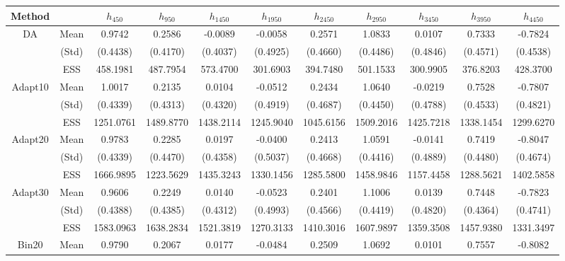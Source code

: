 { \renewcommand{\arraystretch}{1.2} 
\begin{table} 
\center 
\begin{tabular}{cc ccccccccc} 
 Method &  & $h_{450}$ & $h_{950}$ & $h_{1450}$ & $h_{1950}$ & $h_{2450}$ & $h_{2950}$ & $h_{3450}$ & $h_{3950}$ & $h_{4450}$ \\ \hline  \hline
\rowcolor{LightCyan} 
DA & Mean 
 & 0.9742  & 0.2586  & -0.0089  & -0.0058  & 0.2571  & 1.0833  & 0.0107  & 0.7333  & -0.7824  \\  [0.75ex] 
 & (Std) 
 & (0.4438)  & (0.4170)  & (0.4037)  & (0.4925)  & (0.4660)  & (0.4486)  & (0.4846)  & (0.4571)  & (0.4538)  \\  [0.75ex] 
 [111.83 s] & ESS 
 & 458.1981  & 487.7954  & 573.4700  & 301.6903  & 394.7480  & 501.1533  & 300.9905  & 376.8203  & 428.3700  \\  [0.75ex] 
\rowcolor{LightCyan} 
Adapt10 & Mean 
 & 1.0017  & 0.2135  & 0.0104  & -0.0512  & 0.2434  & 1.0640  & -0.0219  & 0.7528  & -0.7807  \\  [0.75ex] 
 & (Std) 
 & (0.4339)  & (0.4313)  & (0.4320)  & (0.4919)  & (0.4687)  & (0.4450)  & (0.4788)  & (0.4533)  & (0.4821)  \\  [0.75ex] 
 [1980.48 s] & ESS 
 & 1251.0761  & 1489.8770  & 1438.2114  & 1245.9040  & 1045.6156  & 1509.2016  & 1425.7218  & 1338.1454  & 1299.6270  \\  [0.75ex] 
\rowcolor{LightCyan} 
Adapt20 & Mean 
 & 0.9783  & 0.2285  & 0.0197  & -0.0400  & 0.2413  & 1.0591  & -0.0141  & 0.7419  & -0.8047  \\  [0.75ex] 
 & (Std) 
 & (0.4339)  & (0.4470)  & (0.4358)  & (0.5037)  & (0.4668)  & (0.4416)  & (0.4889)  & (0.4480)  & (0.4674)  \\  [0.75ex] 
 [2290.29 s] & ESS 
 & 1666.9895  & 1223.5629  & 1435.3243  & 1330.1456  & 1285.5800  & 1458.9846  & 1157.4458  & 1288.5621  & 1402.5858  \\  [0.75ex] 
\rowcolor{LightCyan} 
Adapt30 & Mean 
 & 0.9606  & 0.2249  & 0.0140  & -0.0523  & 0.2401  & 1.1006  & 0.0139  & 0.7448  & -0.7823  \\  [0.75ex] 
 & (Std) 
 & (0.4388)  & (0.4385)  & (0.4312)  & (0.4993)  & (0.4566)  & (0.4419)  & (0.4820)  & (0.4364)  & (0.4741)  \\  [0.75ex] 
 [2566.66 s] & ESS 
 & 1583.0963  & 1638.2834  & 1521.3819  & 1270.3133  & 1410.3016  & 1607.9897  & 1359.3508  & 1457.9380  & 1331.3497  \\  [0.75ex] 
\rowcolor{LightCyan} 
Bin20 & Mean 
 & 0.9790  & 0.2067  & 0.0177  & -0.0484  & 0.2509  & 1.0692  & 0.0101  & 0.7557  & -0.8082  \\  [0.75ex] 

\end{tabular}
\end{table}}
